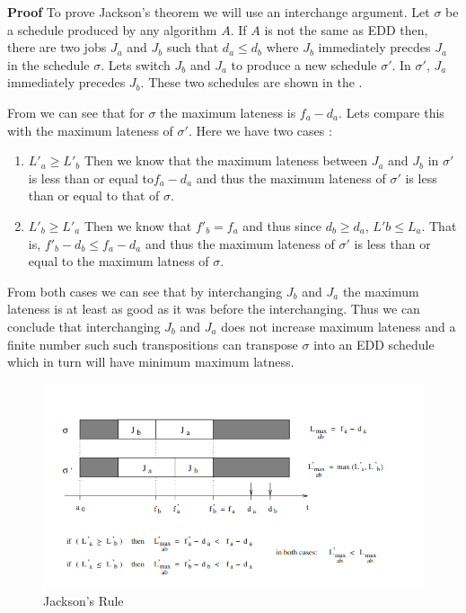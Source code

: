 \documentclass{hw}
\begin{document}
\textbf{Proof} To prove Jackson's theorem we will use an interchange argument.
Let $\sigma$ be a schedule produced by any algorithm $A$. If $A$ is not the
same as EDD then, there are two jobs $J_a$ and $J_b$ such that $d_a \leq d_b$
where $J_b$ immediately precdes $J_a$ in the schedule $\sigma$. Lets switch
$J_b$ and $J_a$ to produce a new schedule $\sigma '$. In $\sigma '$, $J_a$
immediately precedes $J_b$. These two schedules are shown in the
. 

From  we can see that for $\sigma$ the maximum lateness
is $f_a - d_a$. Lets compare this with the maximum lateness of $\sigma '$. Here
we have two cases :

\begin{enumerate}
  \item $L'_a \geq L'_b$ Then we know that the maximum lateness between $J_a$
    and $J_b$ in $\sigma '$ is less than or equal to$f_a - d_a$ and thus the
    maximum lateness of $\sigma '$ is less than or equal to that of $\sigma$.
  \item $L'_b \geq L'_a$ Then we know that $f'_b = f_a$ and thus since $d_b
    \geq d_a$, $L'b \leq L_a$. That is, $f'_b - d_b \leq f_a - d_a$ and thus
    the maximum lateness of $\sigma '$ is less than or equal to the maximum
    latness of $\sigma$.
\end{enumerate}

From both cases we can see that by interchanging $J_b$ and $J_a$ the maximum
lateness is at least as good as it was before the interchanging. Thus we can
conclude that interchanging $J_b$ and $J_a$ does not increase maximum lateness
and a finite number such such transpositions can transpose $\sigma$ into an EDD
schedule which in turn will have minimum maximum latness. 
\begin{figure}[H]
  \centering
  \includegraphics[scale=0.75]{img/jacksons}
  \caption{Jackson's Rule}
  \label{fig:jackson}
\end{figure}
\end{document}
